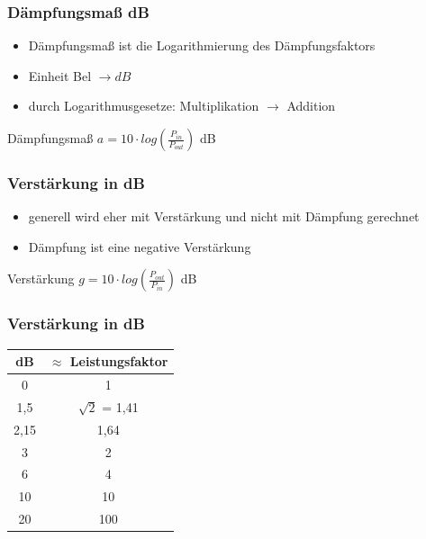 \begin{frame}
  \frametitle{Dämpfungsmaß dB}
  \begin{itemize}
    \item Dämpfungsmaß ist die Logarithmierung des Dämpfungsfaktors
    \item Einheit Bel $\rightarrow dB$
    \item durch Logarithmusgesetze: Multiplikation $\rightarrow$ Addition
  \end{itemize}
  \vspace{0.5cm}
  \begin{block}{Dämpfungsmaß}
    \Huge{$a = 10 \cdot log(\frac{P_{in}}{P_{out}})$ dB}
  \end{block}
\end{frame}

\begin{frame}
  \frametitle{Verstärkung in dB}
  \begin{itemize}
    \item generell wird eher mit Verstärkung und nicht mit Dämpfung gerechnet
    \item Dämpfung ist eine negative Verstärkung
  \end{itemize}
  \vspace{1cm}
  \begin{block}{Verstärkung}
    \Huge{$g = 10 \cdot log(\frac{P_{out}}{P_{in}})$ dB}
  \end{block}
\end{frame}

\begin{frame}
  \frametitle{Verstärkung in dB}
  \begin{center}
    \begin{Large}
      \begin{tabular}{|c|c|}
        \hline
        dB & $\approx$ Leistungsfaktor \\
        \hline \hline
        0    & 1                 \\ \hline
        1,5  & $\sqrt{2}$ = 1,41 \\ \hline
        2,15 & 1,64              \\ \hline
        3    & 2                 \\ \hline
        6    & 4                 \\ \hline
        10   & 10                \\ \hline
        20   & 100               \\ \hline
      \end{tabular}
    \end{Large}
  \end{center}
\end{frame}

